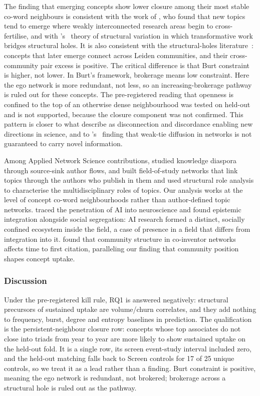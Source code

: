 \documentclass[11pt,letterpaper]{article}
\begin{document}
The finding that emerging concepts show lower closure among their most stable co-word neighbours is consistent
with the work of \citet{Salatino2017}, who found that new topics tend to emerge where weakly interconnected
research areas begin to cross-fertilise, and with \citeauthor{Chen2009}'s~\citeyearpar{Chen2009} theory of structural variation
in which transformative work bridges structural holes. It is also consistent with the structural-holes
literature~\citep{Burt2004}: concepts that later emerge connect across Leiden communities, and their
cross-community pair excess is positive. The critical difference is that Burt constraint is higher, not lower.
In Burt's framework, brokerage means low constraint. Here the ego network is more redundant, not less, so an
increasing-brokerage pathway is ruled out for these concepts. The pre-registered reading that openness is
confined to the top of an otherwise dense neighbourhood was tested on held-out and is not supported, because
the closure component was not confirmed. This pattern is
closer to what \citet{Lin2022} describe as disconnection and discordance enabling new directions in science,
and to \citeauthor{Larson2017}'s~\citeyearpar{Larson2017} finding that weak-tie diffusion in networks is not
guaranteed to carry novel information.

Among Applied Network Science contributions, \citet{Domenico2016} studied knowledge diaspora through
source-sink author flows, and \citet{Cunningham2022} built field-of-study networks that link topics through the
authors who publish in them and used structural role analysis to characterise the multidisciplinary roles of
topics. Our analysis works at the level of concept co-word neighbourhoods rather than author-defined topic
networks. \citet{Fontaine2024} traced the penetration of AI into neuroscience and found epistemic integration
alongside social segregation: AI research formed a distinct, socially confined ecosystem inside the field, a
case of presence in a field that differs from integration into it. \citet{Doonan2019} found that community structure in co-inventor networks affects
time to first citation, paralleling our finding that community position shapes concept uptake.

\subsubsection{Discussion}
\label{sec:rq1_discussion}

Under the pre-registered kill rule, RQ1 is answered negatively: structural precursors of sustained uptake are
volume/churn correlates, and they add nothing to frequency, burst, degree and entropy baselines in prediction.
The qualification is the persistent-neighbour closure row: concepts whose top associates do not close into
triads from year to year are more likely to show sustained uptake on the held-out fold. It is a single row,
its screen event-study interval included zero, and the held-out matching falls back to Screen controls for
17 of 25 unique controls, so we treat it as a lead rather than a finding. Burt constraint is positive, meaning
the ego network is redundant, not brokered; brokerage across a structural hole is ruled out as the pathway.
\end{document}
